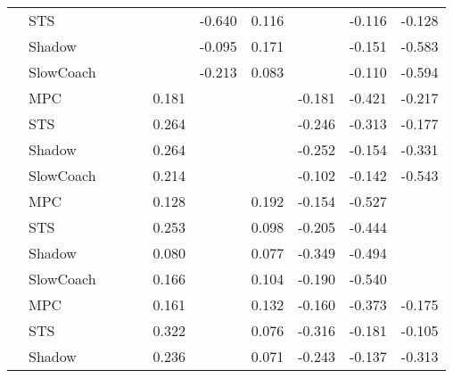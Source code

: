 \begin{tabular}{|l|l|*{9}{c|}}
                                                           & STS &       &        &        &     & -0.640 &  0.116 &      &  -0.116 &   -0.128 \\
                                                           & Shadow &       &        &        &     & -0.095 &  0.171 &      &  -0.151 &   -0.583 \\
                                                           & SlowCoach &       &        &        &     & -0.213 &  0.083 &      &  -0.110 &   -0.594 \\
\midrule
[False, False, False, True, False, False, True, True, True] & MPC &       &        &        &  0.181 &     &     &  -0.181 &  -0.421 &   -0.217 \\
                                                           & STS &       &        &        &  0.264 &     &     &  -0.246 &  -0.313 &   -0.177 \\
                                                           & Shadow &       &        &        &  0.264 &     &     &  -0.252 &  -0.154 &   -0.331 \\
                                                           & SlowCoach &       &        &        &  0.214 &     &     &  -0.102 &  -0.142 &   -0.543 \\
\midrule
[False, False, False, True, False, True, True, True, False] & MPC &       &        &        &  0.128 &     &  0.192 &  -0.154 &  -0.527 &       \\
                                                           & STS &       &        &        &  0.253 &     &  0.098 &  -0.205 &  -0.444 &       \\
                                                           & Shadow &       &        &        &  0.080 &     &  0.077 &  -0.349 &  -0.494 &       \\
                                                           & SlowCoach &       &        &        &  0.166 &     &  0.104 &  -0.190 &  -0.540 &       \\
\midrule
[False, False, False, True, False, True, True, True, True] & MPC &       &        &        &  0.161 &     &  0.132 &  -0.160 &  -0.373 &   -0.175 \\
                                                           & STS &       &        &        &  0.322 &     &  0.076 &  -0.316 &  -0.181 &   -0.105 \\
                                                           & Shadow &       &        &        &  0.236 &     &  0.071 &  -0.243 &  -0.137 &   -0.313 \\

\end{tabular}
